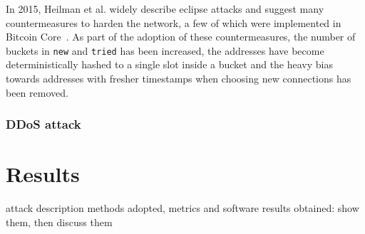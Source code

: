 \documentclass[12pt, letterpaper, twoside]{article}
\begin{document}
In 2015, Heilman et al. widely describe eclipse attacks and suggest many countermeasures to harden the network, a few of which were implemented in Bitcoin Core~\cite{eclipseatk}. As part of the adoption of these countermeasures, the number of buckets in \texttt{new} and \texttt{tried} has been increased, the addresses have become deterministically hashed to a single slot inside a bucket and the heavy bias towards addresses with fresher timestamps when choosing new connections has been removed.

\subsubsection{DDoS attack}\label{sec:ddos}


\section{Results}\label{sec:res}
attack description
methods adopted, metrics and software
results obtained: show them, then discuss them




















\end{document}

